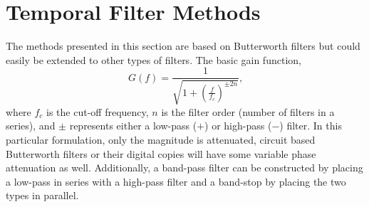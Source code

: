 \section{Temporal Filter Methods}
The methods presented in this section are based on Butterworth filters \cite{Butterworth-1930-DvDrjKha} but could easily be extended to other types of filters.
The basic gain function,
\begin{equation}
 G(f) = \frac{1}{\sqrt{1+\left(\frac{f}{f_c}\right)^{\pm2n}}} \textrm{,}
 \label{eqn:06_butterworth}
\end{equation}
where $f_c$ is the cut-off frequency, $n$ is the filter order (number of filters in a series), and $\pm$ represents either a low-pass ($+$) or high-pass ($-$) filter.
In this particular formulation, only the magnitude is attenuated, circuit based Butterworth filters or their digital copies will have some variable phase attenuation as well.
Additionally, a band-pass filter can be constructed by placing a low-pass in series with a high-pass filter and a band-stop by placing the two types in parallel.

